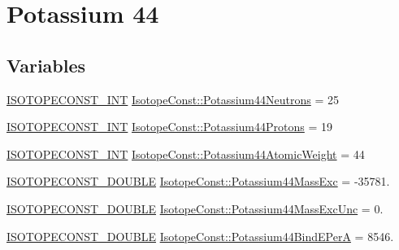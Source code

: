 \hypertarget{group___isotope_const-_potassium-_k44}{}\section{Potassium 44}
\label{group___isotope_const-_potassium-_k44}
\subsection*{Variables}
\begin{DoxyCompactItemize}
\item 
\mbox{\hyperlink{group___isotope_const-_macros_ga5f18360b3e99483a35c32d789e62621c}{I\+S\+O\+T\+O\+P\+E\+C\+O\+N\+S\+T\+\_\+\+I\+NT}} \mbox{\hyperlink{group___isotope_const-_potassium-_k44_gac0ab72bd1f78fd5da019b03480b3a0b1}{Isotope\+Const\+::\+Potassium44\+Neutrons}} = 25
\item 
\mbox{\hyperlink{group___isotope_const-_macros_ga5f18360b3e99483a35c32d789e62621c}{I\+S\+O\+T\+O\+P\+E\+C\+O\+N\+S\+T\+\_\+\+I\+NT}} \mbox{\hyperlink{group___isotope_const-_potassium-_k44_ga743baf968a80d8b2ea2920a445907445}{Isotope\+Const\+::\+Potassium44\+Protons}} = 19
\item 
\mbox{\hyperlink{group___isotope_const-_macros_ga5f18360b3e99483a35c32d789e62621c}{I\+S\+O\+T\+O\+P\+E\+C\+O\+N\+S\+T\+\_\+\+I\+NT}} \mbox{\hyperlink{group___isotope_const-_potassium-_k44_gae02cb6540f2cc47f630a4f35b2a1cd08}{Isotope\+Const\+::\+Potassium44\+Atomic\+Weight}} = 44
\item 
\mbox{\hyperlink{group___isotope_const-_macros_ga8f45a7272ce02c0b4c65c44636ed719a}{I\+S\+O\+T\+O\+P\+E\+C\+O\+N\+S\+T\+\_\+\+D\+O\+U\+B\+LE}} \mbox{\hyperlink{group___isotope_const-_potassium-_k44_ga26e2ef59e18f0952ade946b3f4742028}{Isotope\+Const\+::\+Potassium44\+Mass\+Exc}} = -\/35781.
\item 
\mbox{\hyperlink{group___isotope_const-_macros_ga8f45a7272ce02c0b4c65c44636ed719a}{I\+S\+O\+T\+O\+P\+E\+C\+O\+N\+S\+T\+\_\+\+D\+O\+U\+B\+LE}} \mbox{\hyperlink{group___isotope_const-_potassium-_k44_ga9ade5fa8d20d204d47dd5082d29aa204}{Isotope\+Const\+::\+Potassium44\+Mass\+Exc\+Unc}} = 0.
\item 
\mbox{\hyperlink{group___isotope_const-_macros_ga8f45a7272ce02c0b4c65c44636ed719a}{I\+S\+O\+T\+O\+P\+E\+C\+O\+N\+S\+T\+\_\+\+D\+O\+U\+B\+LE}} \mbox{\hyperlink{group___isotope_const-_potassium-_k44_ga17eb434611c43b0c0f0e56b445ae9777}{Isotope\+Const\+::\+Potassium44\+Bind\+E\+PerA}} = 8546.
\item 

\end{DoxyCompactItemize}
